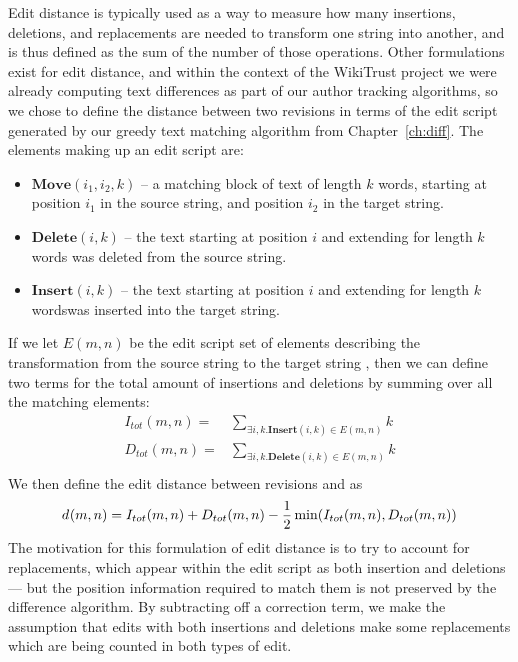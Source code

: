 Edit distance is typically used as a way to measure how many
insertions, deletions, and replacements are needed to transform
one string into another, and is thus defined as the sum of the
number of those operations.
Other formulations exist for edit distance, and within the
context of the WikiTrust project we were already computing
text differences as part of our author tracking algorithms,
so we chose to define the distance between two revisions
in terms of the edit script generated by our greedy text
matching algorithm from Chapter~\ref{ch:diff}.
The elements making up an edit script are:
\begin{itemize}
\item $\mathbf{Move}(i_1, i_2, k)$ -- a matching block of text of
    length $k$ words, starting at position $i_1$ in the source string,
    and position $i_2$ in the target string.
\item $\mathbf{Delete}(i, k)$ -- the text starting at position $i$
    and extending for length $k$ words was deleted from the source string.
\item $\mathbf{Insert}(i, k)$ -- the text starting at position $i$
    and extending for length $k$  wordswas inserted into the target string.
\end{itemize}
If we let $E(m,n)$ be the edit script set of elements describing the
transformation from the source string 
to the target string ,
then we can define two terms for the total amount of insertions
and deletions by summing over all the matching elements:
\begin{align*}
  I_{tot}(m,n) =& \sum_{\exists i, k. \mathbf{Insert}(i, k) \in E(m,n)} k \\
  D_{tot}(m,n) =& \sum_{\exists i, k. \mathbf{Delete}(i, k) \in E(m,n)} k \\
\end{align*}
We then define the edit distance between revisions
 and  as
\begin{equation}
    \dist{}{m,n} = I_{tot}(m,n) + D_{tot}(m,n)
        - \frac{1}{2}\min(I_{tot}(m,n), D_{tot}(m,n)) \\
\label{eq:dist}
\end{equation}
The motivation for this formulation of edit distance is
to try to account for replacements, which appear within
the edit script as both insertion and deletions --- but the
position information required to match them is not preserved
by the difference algorithm.
By subtracting off a correction term, we make the assumption
that edits with both insertions and deletions make some
replacements which are being counted in both types of edit.

